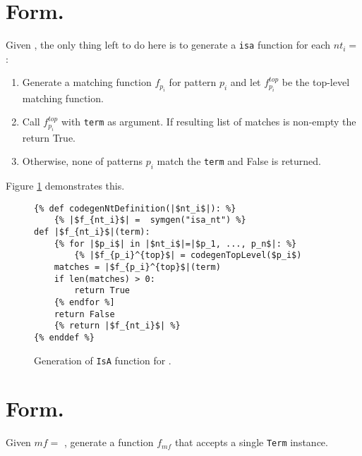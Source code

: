 \section{\DefineLanguageNoArg \space Form.}
Given \DefineLanguage, the only thing left to do here is to generate a \texttt{isa} function for each $nt_i=$\NtDefinition:
\begin{enumerate}
\item Generate a matching function $f_{p_i}$ for pattern $p_i$ and let $f_{p_i}^{top}$ be the top-level matching function. 
\item Call $f_{p_i}^{top}$ with \texttt{term} as argument. If resulting list of matches is non-empty the return True. 
\item Otherwise, none of patterns $p_i$ match the \texttt{term} and False is returned.
\end{enumerate}

Figure \ref{codegen-ntdef} demonstrates this. 

\begin{figure}
\begin{verbatim}
{% def codegenNtDefinition(|$nt_i$|): %}
	{% |$f_{nt_i}$| =  symgen("isa_nt") %}
def |$f_{nt_i}$|(term):
	{% for |$p_i$| in |$nt_i$|=|$p_1, ..., p_n$|: %}
		{% |$f_{p_i}^{top}$| = codegenTopLevel($p_i$)
	matches = |$f_{p_i}^{top}$|(term)
	if len(matches) > 0:
		return True
	{% endfor %]
	return False
	{% return |$f_{nt_i}$| %}
{% enddef %}
\end{verbatim}
\caption{Generation of \texttt{IsA} function for \NtDefinitionNoArgs.}
\label{codegen-ntdef}
\end{figure}

\section{\DefineMetafunctionNoArgs \space Form.}

Given $mf=$ \DefineMetafunction, generate a function $f_{mf}$ that accepts a single \texttt{Term} instance.

